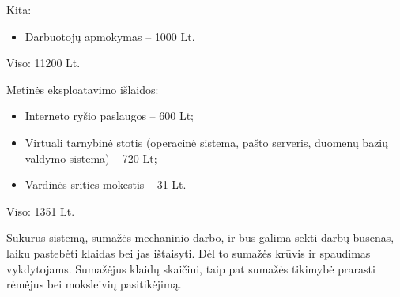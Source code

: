 Kita:
\begin{itemize}
  \item Darbuotoj\k{u} apmokymas – 1000 Lt.
\end{itemize}

Viso: 11200 Lt.

Metin\.{e}s eksploatavimo išlaidos:
\begin{itemize}
  \item Interneto ryšio paslaugos – 600 Lt;
  \item Virtuali tarnybin\.{e} stotis (operacin\.{e} sistema, pašto 
    serveris, duomen\k{u} bazi\k{u} valdymo sistema) – 720 Lt;
  \item Vardin\.{e}s srities mokestis – 31 Lt.
\end{itemize}

Viso: 1351 Lt.

Sukūrus sistemą, sumažės mechaninio darbo, ir bus galima sekti 
darbų būsenas, laiku pastebėti klaidas bei jas ištaisyti. Dėl 
to sumažės krūvis ir spaudimas vykdytojams. Sumažėjus klaidų 
skaičiui, taip pat sumažės tikimybė prarasti rėmėjus bei 
moksleivių pasitikėjimą. 
